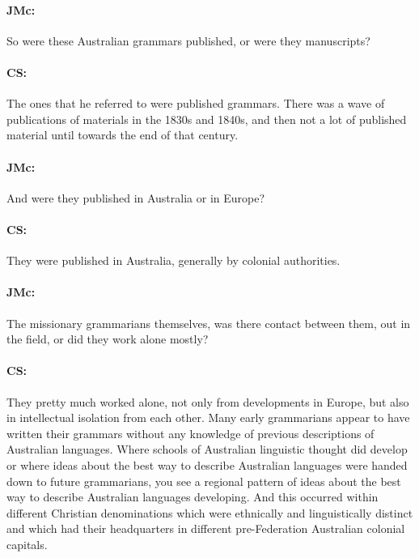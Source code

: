 \documentclass[output=paper]{langscibook}
\begin{document}
\paragraph*{JMc:}  So were these Australian grammars published, or were they manuscripts?


\paragraph*{CS:}  The ones that he referred to were published grammars. There was a wave of publications of materials in the 1830s and 1840s, and then not a lot of published material until towards the end of that century.


\paragraph*{JMc:}  And were they published in Australia or in Europe?


\paragraph*{CS:}  They were published in Australia, generally by colonial authorities.


\paragraph*{JMc:} \begin{sloppypar}The missionary grammarians themselves, was there contact between them, out in the field, or did they work alone mostly?\end{sloppypar}


\paragraph*{CS:}  They pretty much worked alone, not only from developments in Europe, but also in intellectual isolation from each other. Many early grammarians appear to have written their grammars without any knowledge of previous descriptions of Australian languages. Where schools of Australian linguistic thought did develop or where ideas about the best way to describe Australian languages were handed down to future grammarians, you see a regional pattern of ideas about the best way to describe Australian languages developing. And this occurred within different Christian denominations which were ethnically and linguistically distinct and which had their headquarters in different pre-Federation Australian colonial capitals.
\end{document}
